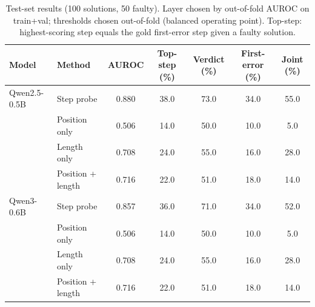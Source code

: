 \begin{table}[t]
\centering
\small
\begin{tabular}{llccccc}
\toprule
Model & Method & AUROC & Top-step (\%) & Verdict (\%) & First-error (\%) & Joint (\%) \\
\midrule
Qwen2.5-0.5B & Step probe & 0.880 & 38.0 & 73.0 & 34.0 & 55.0 \\
 & Position only & 0.506 & 14.0 & 50.0 & 10.0 & 5.0 \\
 & Length only & 0.708 & 24.0 & 55.0 & 16.0 & 28.0 \\
 & Position + length & 0.716 & 22.0 & 51.0 & 18.0 & 14.0 \\
\midrule
Qwen3-0.6B & Step probe & 0.857 & 36.0 & 71.0 & 34.0 & 52.0 \\
 & Position only & 0.506 & 14.0 & 50.0 & 10.0 & 5.0 \\
 & Length only & 0.708 & 24.0 & 55.0 & 16.0 & 28.0 \\
 & Position + length & 0.716 & 22.0 & 51.0 & 18.0 & 14.0 \\
\bottomrule
\end{tabular}
\caption{Test-set results (100 solutions, 50 faulty). Layer chosen by out-of-fold AUROC on train+val; thresholds chosen out-of-fold (balanced operating point). Top-step: highest-scoring step equals the gold first-error step given a faulty solution.}
\label{tab:member4_main}
\end{table}